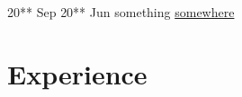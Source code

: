 \documentclass[letterpaper]{DS_class_file} %
\begin{document}
\begin{twenty} %
   	\twentyitem
	    {20** Sep}
	    {20** Jun}
	    {\hspace{0.2cm}something
}
	    {\href{https://www.es.osaka-u.ac.jp/en/index.html}{\hspace{0.27cm}somewhere}}
	    {}
	    {} 
\end{twenty}

\section{Experience}
\end{document}
